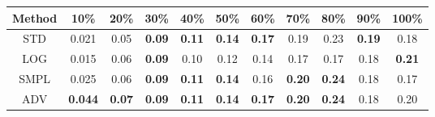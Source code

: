 \documentclass{standalone}
\begin{document}
\begin{tabular}{c|cccccccccc}
      \toprule
      Method & 10\% & 20\% & 30\% & 40\% & 50\% & 60\% & 70\% & 80\% & 90\% & 100\% \\
      \midrule
STD & 0.021 & 0.05 & \textbf{0.09} & \textbf{0.11} & \textbf{0.14} & \textbf{0.17} & 0.19 & 0.23 & \textbf{0.19} & 0.18\\
LOG & 0.015 & 0.06 & \textbf{0.09} & 0.10 & 0.12 & 0.14 & 0.17 & 0.17 & 0.18 & \textbf{0.21}\\
SMPL & 0.025 & 0.06 & \textbf{0.09} & \textbf{0.11} & \textbf{0.14} & 0.16 & \textbf{0.20} & \textbf{0.24} & 0.18 & 0.17\\
ADV & \textbf{0.044} & \textbf{0.07} & \textbf{0.09} & \textbf{0.11} & \textbf{0.14} & \textbf{0.17} & \textbf{0.20} & \textbf{0.24} & 0.18 & 0.20\\
  \bottomrule
\end{tabular}
\end{document}
